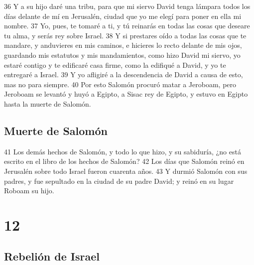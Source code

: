 36 Y a su hijo daré una tribu, para que mi siervo David tenga lámpara todos los días delante de mí en Jerusalén, ciudad que yo me elegí para poner en ella mi nombre.
37 Yo, pues, te tomaré a ti, y tú reinarás en todas las cosas que deseare tu alma, y serás rey sobre Israel.
38 Y si prestares oído a todas las cosas que te mandare, y anduvieres en mis caminos, e hicieres lo recto delante de mis ojos, guardando mis estatutos y mis mandamientos, como hizo David mi siervo, yo estaré contigo y te edificaré casa firme, como la edifiqué a David, y yo te entregaré a Israel.
39 Y yo afligiré a la descendencia de David a causa de esto, mas no para siempre.
40 Por esto Salomón procuró matar a Jeroboam, pero Jeroboam se levantó y huyó a Egipto, a Sisac rey de Egipto, y estuvo en Egipto hasta la muerte de Salomón.

\section*{Muerte de Salomón}

41 Los demás hechos de Salomón, y todo lo que hizo, y su sabiduría, ¿no está escrito en el libro de los hechos de Salomón?
42 Los días que Salomón reinó en Jerusalén sobre todo Israel fueron cuarenta años.
43 Y durmió Salomón con sus padres, y fue sepultado en la ciudad de su padre David; y reinó en su lugar Roboam su hijo.

\chapter{12}

\section*{Rebelión de Israel}

